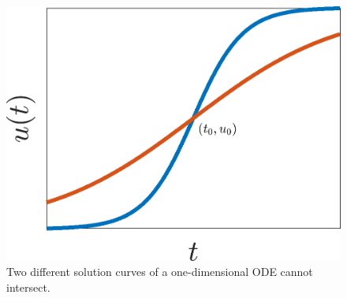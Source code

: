 \begin{figure}[!!!h!!!tb]
\centering
\includegraphics[width=\ttp]{../Pictures/Intersection.png}
\caption{\label{Intersect}Two different solution curves of a one-dimensional ODE cannot intersect.}
\end{figure}

